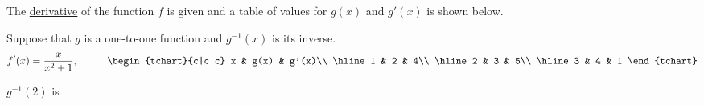\documentclass{ximera}
\author{Gregory Hartman \and Matthew Carr}
\begin{document}
\begin{exercise}



The \underline{derivative} of the function $f$ is given and a table of values for $g(x)$ and $g'(x)$ is shown below.

Suppose that $g$ is a one-to-one function and $g^{-1}(x)$ is its inverse.
\[
f'(x)=\frac{x}{x^2+1},\hskip 1cm
\begin{tchart}{c|c|c}
x & g(x) & g'(x)\\ \hline
1 & 2 & 4\\ \hline
2 & 3 & 5\\ \hline
3 & 4 & 1
\end{tchart}
\]

$g^{-1}(2)$ is
\begin{prompt}
\begin{multipleChoice}
\end{multipleChoice}
\end{prompt}

\end{exercise}
\end{document}
